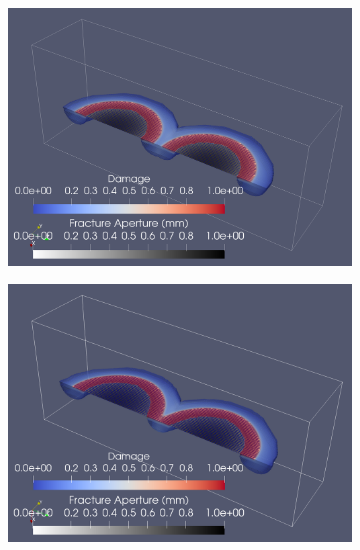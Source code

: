 \begin{figure}[h]
\begin{subfigure}{.45\textwidth}
  \centering
  \includegraphics[width=\linewidth]{Chapter4/figures/merging/merging_t_27.png}
  \caption{}
  \label{fig:merge_t_2}
\end{subfigure}
\hspace{0.85cm}
\begin{subfigure}{.45\textwidth}
  \centering
  \includegraphics[width=\linewidth]{Chapter4/figures/merging/merging_t_35.png}
  \caption{}
  \label{fig:merge_t_3}
\end{subfigure}


\end{figure}
